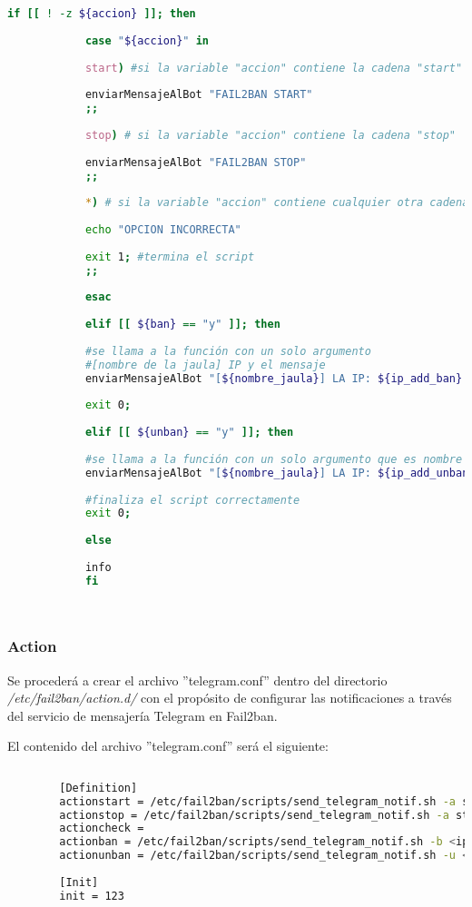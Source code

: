 \begin{lstlisting}[language=Bash, caption=Script - send telegram notif]
			if [[ ! -z ${accion} ]]; then
			
			case "${accion}" in
			
			start) #si la variable "accion" contiene la cadena "start"
			
			enviarMensajeAlBot "FAIL2BAN START"
			;;
			
			stop) # si la variable "accion" contiene la cadena "stop"
			
			enviarMensajeAlBot "FAIL2BAN STOP"
			;;
			
			*) # si la variable "accion" contiene cualquier otra cadena
			
			echo "OPCION INCORRECTA"
			
			exit 1; #termina el script
			;;
			
			esac
			
			elif [[ ${ban} == "y" ]]; then
			
			#se llama a la función con un solo argumento
			#[nombre de la jaula] IP y el mensaje
			enviarMensajeAlBot "[${nombre_jaula}] LA IP: ${ip_add_ban} FUE BANEADA"
			
			exit 0;
			
			elif [[ ${unban} == "y" ]]; then
			
			#se llama a la función con un solo argumento que es nombre de la jaula, ip y mensaje
			enviarMensajeAlBot "[${nombre_jaula}] LA IP: ${ip_add_unban} FUE DESBANEADA"
			
			#finaliza el script correctamente
			exit 0;
			
			else
			
			info
			fi
			
	
		\end{lstlisting}
	
		\subsubsection{Action}
	
		Se procederá a crear el archivo ''telegram.conf'' dentro del directorio \textit{/etc/fail2ban/action.d/} con el propósito de configurar las notificaciones a través del servicio de mensajería Telegram en Fail2ban.\par
	
		El contenido del archivo ''telegram.conf'' será el siguiente:\par
	
		\begin{lstlisting}[language=Bash, caption= Action]	
		
		[Definition]
		actionstart = /etc/fail2ban/scripts/send_telegram_notif.sh -a start
		actionstop = /etc/fail2ban/scripts/send_telegram_notif.sh -a stop
		actioncheck =
		actionban = /etc/fail2ban/scripts/send_telegram_notif.sh -b <ip>
		actionunban = /etc/fail2ban/scripts/send_telegram_notif.sh -u <ip>
		
		[Init]
		init = 123
	
			
		\end{lstlisting}
			
